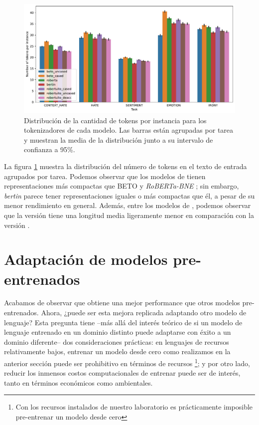 \begin{figure}
    \centering
    \includegraphics[width=\textwidth]{img/robertuito/length_tokens.pdf}
    \caption{Distribución de la cantidad de tokens por instancia para los tokenizadores de cada modelo. Las barras están agrupadas por tarea y muestran la media de la distribución junto a su intervalo de confianza a 95\%.}
    \label{fig:length_tokens}
\end{figure}

La figura \ref{fig:length_tokens} muestra la distribución del número de tokens en el texto de entrada agrupados por tarea. Podemos observar que los modelos de \robertuito{} tienen representaciones más compactas que BETO  y \emph {RoBERTa-BNE} ; sin embargo, \emph{bertin} parece tener representaciones iguales o más compactas que él, a pesar de su menor rendimiento en general. Además, entre los modelos de \robertuito{}, podemos observar que la versión \deacc{} tiene una longitud media ligeramente menor en comparación con la versión \uncased{}.


\section{Adaptación de modelos pre-entrenados}
\label{sec:domain_adaptation_vs_robertuito}

Acabamos de observar que \robertuito{} obtiene una mejor performance que otros modelos pre-entrenados. Ahora, ¿puede ser esta mejora replicada adaptando otro modelo de lenguaje? Esta pregunta tiene --más allá del interés teórico de si un modelo de lenguaje entrenado en un dominio distinto puede adaptarse con éxito a un dominio diferente-- dos consideraciones prácticas: en lenguajes de recursos relativamente bajos, entrenar un modelo desde cero como realizamos en la anterior sección puede ser prohibitivo en términos de recursos \footnote{Con los recursos instalados de nuestro laboratorio es prácticamente imposible pre-entrenar un modelo desde cero}; y por otro lado, reducir los inmensos costos computacionales de entrenar puede ser de interés, tanto en términos económicos como ambientales.

